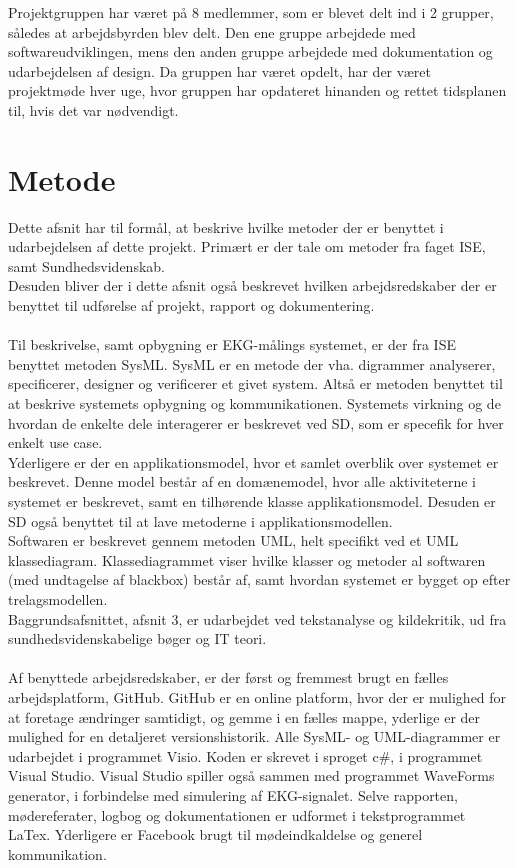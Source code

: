 Projektgruppen har været på 8 medlemmer, som er blevet delt ind i 2 grupper, således at arbejdsbyrden blev delt. Den ene gruppe arbejdede med softwareudviklingen, mens den anden gruppe arbejdede med dokumentation og udarbejdelsen af design. Da gruppen har været opdelt, har der været projektmøde hver uge, hvor gruppen har opdateret hinanden og rettet tidsplanen til, hvis det var nødvendigt.


\section{Metode} 
Dette afsnit har til formål, at beskrive hvilke metoder der er benyttet i udarbejdelsen af dette projekt. Primært er der tale om metoder fra faget ISE, samt Sundhedsvidenskab.\\ 
Desuden bliver der i dette afsnit også beskrevet hvilken arbejdsredskaber der er benyttet til udførelse af projekt, rapport og dokumentering.\\ \\
Til beskrivelse, samt opbygning er EKG-målings systemet, er der fra ISE benyttet metoden SysML. SysML er en metode der vha. digrammer analyserer, specificerer, designer og verificerer et givet system. Altså er metoden benyttet til at beskrive systemets opbygning og kommunikationen. Systemets virkning og de hvordan de enkelte dele interagerer er beskrevet ved SD, som er specefik for hver enkelt use case.\\ 
Yderligere er der en applikationsmodel, hvor et samlet overblik over systemet er beskrevet. Denne model består af en domænemodel, hvor alle aktiviteterne i systemet er beskrevet, samt en tilhørende klasse applikationsmodel. Desuden er SD også benyttet til at lave metoderne i applikationsmodellen.\\ 
Softwaren er beskrevet gennem metoden UML, helt specifikt ved et UML klassediagram. Klassediagrammet viser hvilke klasser og metoder al softwaren (med undtagelse af blackbox) består af, samt hvordan systemet er bygget op efter trelagsmodellen.\\
Baggrundsafsnittet, afsnit 3, er udarbejdet ved tekstanalyse og kildekritik, ud fra sundhedsvidenskabelige bøger og IT teori.\\ \\
Af benyttede arbejdsredskaber, er der først og fremmest brugt en fælles arbejdsplatform, GitHub. GitHub er en online platform, hvor der er mulighed for at foretage ændringer samtidigt, og gemme i en fælles mappe, yderlige er der mulighed for en detaljeret versionshistorik. Alle SysML- og UML-diagrammer er udarbejdet i programmet Visio. Koden er skrevet i sproget c\#, i programmet Visual Studio. Visual Studio spiller også sammen med programmet WaveForms generator, i forbindelse med simulering af EKG-signalet. Selve rapporten, mødereferater, logbog og dokumentationen er udformet i tekstprogrammet LaTex. Yderligere er Facebook brugt til mødeindkaldelse og generel kommunikation.



